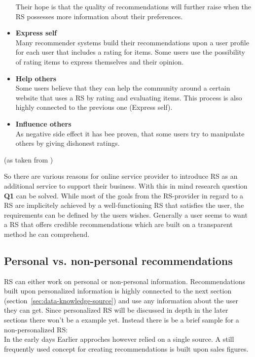 \begin{itemize}
        Their hope is that the quality of recommendations will further raise when the RS possesses more information about their preferences.
    \item\textbf{Express self}\hfill\\
        Many recommender systems build their recommendations upon a user profile for each user that includes a rating for items.
        Some users use the possibility of rating items to express themselves and their opinion.
    \item\textbf{Help others}\hfill\\
        Some users believe that they can help the community around a certain website that uses a RS by rating and evaluating items.
        This process is also highly connected to the previous one (Express self).
    \item\textbf{Influence others}\hfill\\
        As negative side effect it has bee proven, that some users try to manipulate others by giving dishonest ratings.
\end{itemize}
(as taken from \citep[p.~13-17]{herlocker:2004})

So there are various reasons for online service provider to introduce RS as an additional service to support their business.
With this in mind research question \textbf{Q1} can be solved.
While most of the goals from the RS-provider in regard to a RS are implicitely achieved by a well-functioning RS that satisfies the user, the requirements can be defined by the users wishes.
Generally a user seems to want a RS that offers credible recommendations which are built on a transparent method he can comprehend.



\subsection{Personal vs. non-personal recommendations}
RS can either work on personal or non-personal information.
Recommendations built upon personalized information is highly connected to the next section (section~\ref{sec:data-knowledge-source}) and use any information about the user they can get.
Since personalized RS will be discussed in depth in the later sections there won't be a example yet.
Instead there is be a brief sample for a non-personalized RS:
\\
In the early days
Earlier approches however relied on a single source.
A still frequently used concept for creating recommendations is built upon sales figures.

